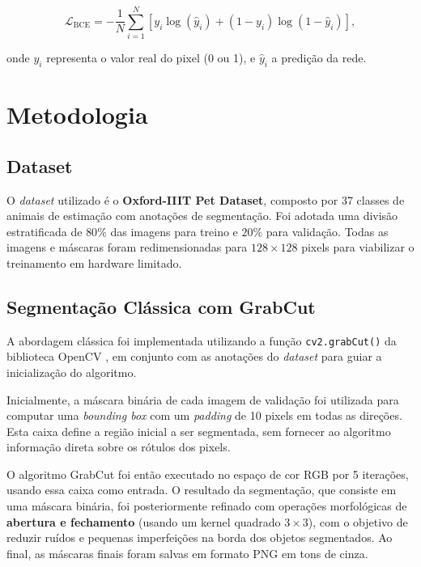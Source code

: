 \documentclass[journal]{IEEEtran}
\begin{document}
\begin{equation}
\mathcal{L}_{\text{BCE}} = -\frac{1}{N} \sum_{i=1}^{N} \left[
    y_i \log(\hat{y}_i) + (1 - y_i) \log(1 - \hat{y}_i)
\right],
\end{equation}

onde $y_i$ representa o valor real do pixel (0 ou 1), e $\hat{y}_i$ a predição da rede.

\section{Metodologia}

\subsection{Dataset}

O \textit{dataset} utilizado é o \textbf{Oxford-IIIT Pet Dataset}, composto por 37 classes de animais de estimação com anotações de segmentação. Foi adotada uma divisão estratificada de $80\%$ das imagens para treino e $20\%$ para validação. Todas as imagens e máscaras foram redimensionadas para $128 \times 128$ pixels para viabilizar o treinamento em hardware limitado.

\subsection{Segmentação Clássica com GrabCut}

A abordagem clássica foi implementada utilizando a função \texttt{cv2.grabCut()} da biblioteca OpenCV \cite{opencv_library}, em conjunto com as anotações do \textit{dataset} para guiar a inicialização do algoritmo.

Inicialmente, a máscara binária de cada imagem de validação foi utilizada para computar uma \textit{bounding box} com um \textit{padding} de 10 pixels em todas as direções. Esta caixa define a região inicial a ser segmentada, sem fornecer ao algoritmo informação direta sobre os rótulos dos pixels.

O algoritmo GrabCut foi então executado no espaço de cor RGB
por 5 iterações, usando essa caixa como entrada. O resultado da segmentação, que consiste em uma máscara binária, foi posteriormente refinado com operações morfológicas de \textbf{abertura e fechamento} (usando um kernel quadrado $3 \times 3$), com o objetivo de reduzir ruídos e pequenas imperfeições na borda dos objetos segmentados. Ao final, as máscaras finais foram salvas em formato PNG em tons de cinza.
\end{document}
